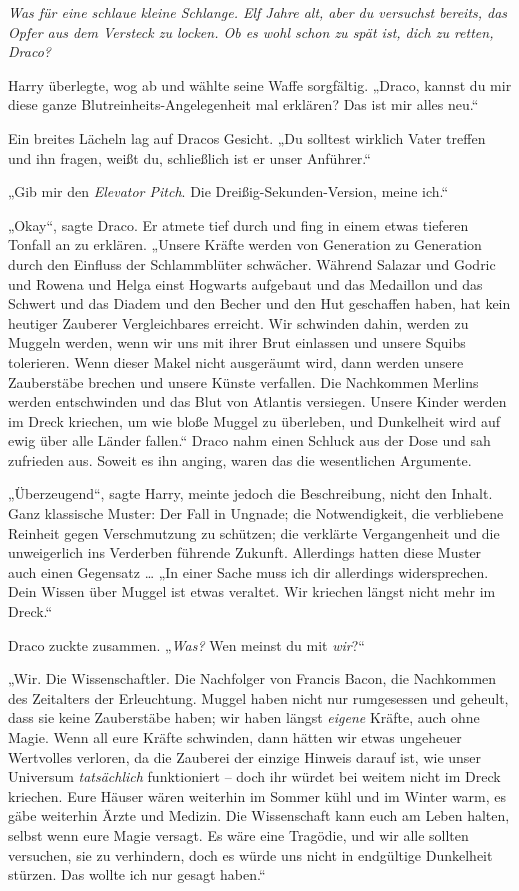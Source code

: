 {\emph{Was für eine schlaue kleine Schlange. Elf Jahre alt, aber du versuchst bereits, das Opfer aus dem Versteck zu locken. Ob es wohl schon zu spät ist, dich zu retten, Draco?}

Harry überlegte, wog ab und wählte seine Waffe sorgfältig. „Draco, kannst du mir diese ganze Blutreinheits-Angelegenheit mal erklären? Das ist mir alles neu.“

Ein breites Lächeln lag auf Dracos Gesicht. „Du solltest wirklich Vater treffen und ihn fragen, weißt du, schließlich ist er unser Anführer.“

„Gib mir den \emph{Elevator Pitch}. Die Dreißig-Sekunden-Version, meine ich.“

„Okay“, sagte Draco. Er atmete tief durch und fing in einem etwas tieferen Tonfall an zu erklären. „Unsere Kräfte werden von Generation zu Generation durch den Einfluss der Schlammblüter schwächer. Während Salazar und Godric und Rowena und Helga einst Hogwarts aufgebaut und das Medaillon und das Schwert und das Diadem und den Becher und den Hut geschaffen haben, hat kein heutiger Zauberer Vergleichbares erreicht. Wir schwinden dahin, werden zu Muggeln werden, wenn wir uns mit ihrer Brut einlassen und unsere Squibs tolerieren. Wenn dieser Makel nicht ausgeräumt wird, dann werden unsere Zauberstäbe brechen und unsere Künste verfallen. Die Nachkommen Merlins werden entschwinden und das Blut von Atlantis versiegen. Unsere Kinder werden im Dreck kriechen, um wie bloße Muggel zu überleben, und Dunkelheit wird auf ewig über alle Länder fallen.“ Draco nahm einen Schluck aus der Dose und sah zufrieden aus. Soweit es ihn anging, waren das die wesentlichen Argumente.

„Überzeugend“, sagte Harry, meinte jedoch die Beschreibung, nicht den Inhalt. Ganz klassische Muster: Der Fall in Ungnade; die Notwendigkeit, die verbliebene Reinheit gegen Verschmutzung zu schützen; die verklärte Vergangenheit und die unweigerlich ins Verderben führende Zukunft. Allerdings hatten diese Muster auch einen Gegensatz … „In einer Sache muss ich dir allerdings widersprechen. Dein Wissen über Muggel ist etwas veraltet. Wir kriechen längst nicht mehr im Dreck.“

Draco zuckte zusammen. „\emph{Was?} Wen meinst du mit \emph{wir}?“

„Wir. Die Wissenschaftler. Die Nachfolger von Francis Bacon, die Nachkommen des Zeitalters der Erleuchtung. Muggel haben nicht nur rumgesessen und geheult, dass sie keine Zauberstäbe haben; wir haben längst \emph{eigene} Kräfte, auch ohne Magie. Wenn all eure Kräfte schwinden, dann hätten wir etwas ungeheuer Wertvolles verloren, da die Zauberei der einzige Hinweis darauf ist, wie unser Universum \emph{tatsächlich} funktioniert -- doch ihr würdet bei weitem nicht im Dreck kriechen. Eure Häuser wären weiterhin im Sommer kühl und im Winter warm, es gäbe weiterhin Ärzte und Medizin. Die Wissenschaft kann euch am Leben halten, selbst wenn eure Magie versagt. Es wäre eine Tragödie, und wir alle sollten versuchen, sie zu verhindern, doch es würde uns nicht in endgültige Dunkelheit stürzen. Das wollte ich nur gesagt haben.“

}
